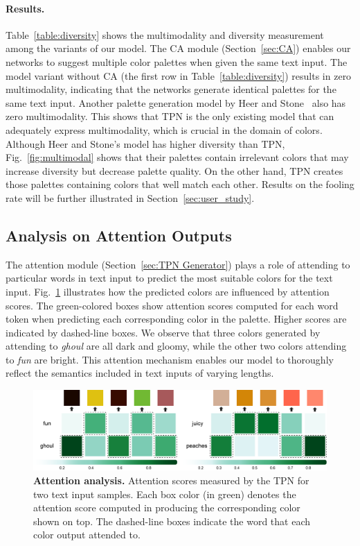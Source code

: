 \documentclass[runningheads]{llncs}
\begin{document}
\paragraph{Results.}
Table~\ref{table:diversity} shows the multimodality and diversity measurement among the variants of our model. The CA module (Section~\ref{sec:CA}) enables our networks to suggest multiple color palettes when given the same text input. The model variant without CA (the first row in Table~\ref{table:diversity}) results in zero multimodality, indicating that the networks generate identical palettes for the same text input. Another palette generation model by Heer and Stone~\cite{heer2012color} also has zero multimodality. This shows that TPN is the only existing model that can adequately express multimodality, which is crucial in the domain of colors. Although Heer and Stone's model has higher diversity than TPN, Fig.~\ref{fig:multimodal} shows that their palettes contain irrelevant colors that may increase diversity but decrease palette quality. On the other hand, TPN creates those palettes containing colors that well match each other. Results on the fooling rate will be further illustrated in Section~\ref{sec:user_study}. 

\subsection{Analysis on Attention Outputs}
The attention module (Section~\ref{sec:TPN Generator}) plays a role of attending to particular words in text input to predict the most suitable colors for the text input. Fig.~\ref{fig:attention} illustrates how the predicted colors are influenced by attention scores. The green-colored boxes show attention scores computed for each word token when predicting each corresponding color in the palette. Higher scores are indicated by dashed-line boxes. We observe that three colors generated by attending to \textit{ghoul} are all dark and gloomy, while the other two colors attending to \textit{fun} are bright. This attention mechanism enables our model to thoroughly reflect the semantics included in text inputs of varying lengths. 


\begin{figure}[t]
\centering
\includegraphics[width=\textwidth]{./attention.png}
\caption{\textbf{Attention analysis.} Attention scores measured by the TPN for two text input samples. Each box color (in green) denotes the attention score computed in producing the corresponding color shown on top. The dashed-line boxes indicate the word that each color output attended to.}\label{fig:attention}
\end{figure} 
\end{document}
